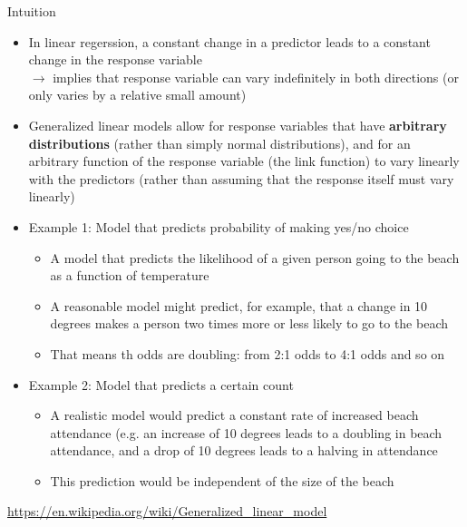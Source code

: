 \documentclass[aspectratio=169]{beamer}
\begin{document}
\begin{frame}[allowframebreaks]{Intuition}
  \begin{itemize}
    \item In linear regerssion, a constant change in a predictor leads to a
      constant change in the response variable\\
        $\to$ implies that response variable can vary indefinitely in both
          directions (or only varies by a relative small amount)
    \item Generalized linear models allow for response variables that have
      \textbf{arbitrary distributions} (rather than simply normal
      distributions), and for an arbitrary function of the response
      variable (the link function) to vary linearly with the predictors
      (rather than assuming that the response itself must vary linearly)
      \framebreak
    \item Example 1: Model that predicts probability of making yes/no
      choice
      \begin{itemize}
        \item A model that predicts the likelihood of a given person going
          to the beach as a function of temperature
        \item A reasonable model might predict, for example, that a change
          in 10 degrees makes a person two times more or less likely to go
          to the beach
        \item That means th odds are doubling: from 2:1 odds to 4:1 odds
          and so on
      \end{itemize}
    \item Example 2: Model that predicts a certain count
      \begin{itemize}
        \item A realistic model would predict a constant rate of
          increased beach attendance (e.g. an increase of 10 degrees leads
          to a doubling in beach attendance, and a drop of 10 degrees leads
          to a halving in attendance
        \item This prediction would be independent of the size of the beach
      \end{itemize}
  \end{itemize}
  \vspace{.5cm}
{\footnotesize\url{https://en.wikipedia.org/wiki/Generalized_linear_model}}
\end{frame}
\end{document}
